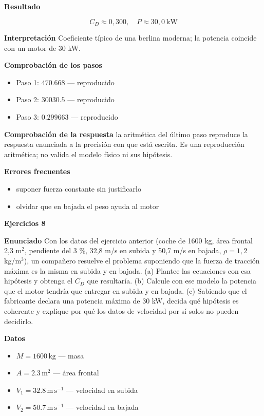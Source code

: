 \documentclass[10pt,openany]{book}
\begin{document}
\noindent\textbf{Resultado}

\[
C_D \approx 0{,}300,\quad P \approx 30{,}0\ \mathrm{kW}
\]

\noindent\textbf{Interpretación}
Coeficiente típico de una berlina moderna; la potencia coincide con un motor de 30 kW.

\noindent\textbf{Comprobación de los pasos}
\begin{itemize}
\item Paso 1: $470.668$ — reproducido
\item Paso 2: $30030.5$ — reproducido
\item Paso 3: $0.299663$ — reproducido
\end{itemize}

\noindent\textbf{Comprobación de la respuesta} la aritmética del último paso reproduce la respuesta enunciada a la precisión con que está escrita. Es una reproducción aritmética; no valida el modelo físico ni sus hipótesis.

\noindent\textbf{Errores frecuentes}
\begin{itemize}
\item suponer fuerza constante sin justificarlo
\item olvidar que en bajada el peso ayuda al motor
\end{itemize}

\noindent\textbf{Ejercicios 8}

\noindent\textbf{Enunciado}
Con los datos del ejercicio anterior (coche de 1600 kg, área frontal 2,3 m\(^2\), pendiente del 3 \%, 32,8 m/s en subida y 50,7 m/s en bajada, \(\rho = 1{,}2\) kg/m\(^3\)), un compañero resuelve el problema suponiendo que la fuerza de tracción máxima es la misma en subida y en bajada. (a) Plantee las ecuaciones con esa hipótesis y obtenga el \(C_D\) que resultaría. (b) Calcule con ese modelo la potencia que el motor tendría que entregar en subida y en bajada. (c) Sabiendo que el fabricante declara una potencia máxima de 30 kW, decida qué hipótesis es coherente y explique por qué los datos de velocidad por sí solos no pueden decidirlo.

\noindent\textbf{Datos}
\begin{itemize}
\item $M = 1600\,\mathrm{kg}$ — masa
\item $A = 2.3\,\mathrm{m}^{2}$ — área frontal
\item $V_{1} = 32.8\,\mathrm{m}\,\mathrm{s}^{-1}$ — velocidad en subida
\item $V_{2} = 50.7\,\mathrm{m}\,\mathrm{s}^{-1}$ — velocidad en bajada
\end{itemize}
\end{document}

